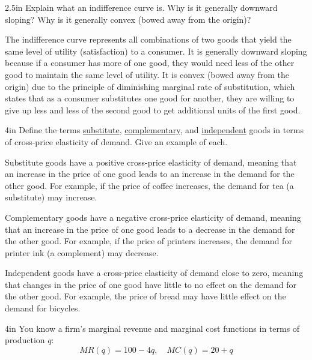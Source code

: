\documentclass[12pt]{exam}
\begin{document}
\begin{questions}
  \begin{shortanswer}[10]{2.5in}
    Explain what an indifference curve is.  Why is it generally downward sloping? Why is
    it generally convex (bowed away from the origin)?
  \end{shortanswer}
  \begin{solution}
    The indifference curve represents all combinations of two goods that yield the same level of
    utility (satisfaction) to a consumer. It is generally downward sloping because if a consumer has
    more of one good, they would need less of the other good to maintain the same level of utility. It
    is convex (bowed away from the origin) due to the principle of diminishing marginal rate of substitution,
    which states that as a consumer substitutes one good for another, they are willing to give up less
    and less of the second good to get additional units of the first good.
  \end{solution}

  \begin{shortanswer}[10]{4in}
    Define the terms \underline{substitute}, \underline{complementary}, and \underline{independent} goods
    in terms of cross-price elasticity of demand. Give an example of each.
  \end{shortanswer}
  \begin{solution}
    Substitute goods have a positive cross-price elasticity of demand, meaning that an increase
    in the price of one good leads to an increase in the demand for the other good. For
    example, if the price of coffee increases, the demand for tea (a substitute) may increase.

    Complementary goods have a negative cross-price elasticity of demand, meaning that an increase
    in the price of one good leads to a decrease in the demand for the other good. For example, if
    the price of printers increases, the demand for printer ink (a complement) may decrease.

    Independent goods have a cross-price elasticity of demand close to zero, meaning that changes
    in the price of one good have little to no effect on the demand for the other good. For example,
    the price of bread may have little effect on the demand for bicycles.
  \end{solution}


  \begin{problem}[10]{4in}
    You know a firm's marginal revenue and marginal cost functions in terms of production $q$:
    \[
      MR(q) = 100 - 4q, \quad MC(q) = 20 + q
    \]


\end{problem}
\end{questions}
\end{document}
